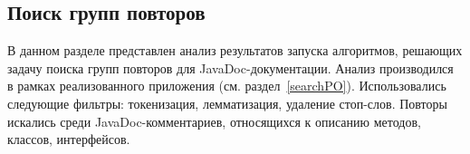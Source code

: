 



\subsection{Поиск групп повторов}
В данном разделе представлен анализ результатов запуска алгоритмов, решающих  {задачу поиска групп повторов} для JavaDoc-документации.
Анализ производился в рамках реализованного приложения (см. раздел~\ref{searchPO}).
Использовались следующие фильтры: токенизация, лемматизация, удаление стоп-слов.
Повторы искались среди JavaDoc-комментариев, относящихся к описанию методов, классов, интерфейсов.

